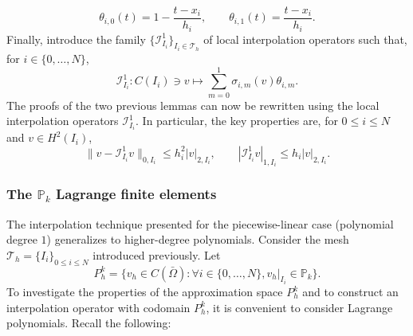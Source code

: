 \documentclass{article}
\begin{document}
$$ \theta_{i,0}(t) = 1 - \frac{t - x_i}{h_i},\qquad \theta_{i,1}(t) = \frac{t - x_i}{h_i}. $$
Finally, introduce the family $\{\mathcal{I}_{I_i}^1\}_{I_i \in \mathcal{T}_h}$ of local interpolation operators such that, for $i \in \{0, \dots, N\}$,
$$ \mathcal{I}_{I_i}^1: C(I_i) \ni v \mapsto \sum_{m=0}^1 \sigma_{i,m}(v) \theta_{i,m}. $$
The proofs of the two previous lemmas can now be rewritten using the local interpolation operators $\mathcal{I}_{I_i}^1$. In particular, the key properties are, for $0 \le i \le N$ and $v \in H^2(I_i)$,
$$ \|v - \mathcal{I}_{I_i}^1 v\|_{0,I_i} \le h_i^2 |v|_{2,I_i},\qquad|\mathcal{I}_{I_i}^1 v|_{1,I_i} \le h_i |v|_{2,I_i}. $$

\subsubsection{The $\mathbb{P}_k$ Lagrange finite elements}
The interpolation technique presented for the piecewise-linear case (polynomial degree $1$) generalizes to higher-degree polynomials. Consider the mesh $\mathcal{T}_h = \{I_i\}_{0 \le i \le N}$ introduced previously. Let
$$ P_h^k = \{ v_h \in C(\bar{\Omega}): \forall i \in \{0, \dots, N\}, v_h|_{I_i} \in \mathbb{P}_k \}. $$
To investigate the properties of the approximation space $P_h^k$ and to construct an interpolation operator with codomain $P_h^k$, it is convenient to consider Lagrange polynomials. Recall the following:
\end{document}
